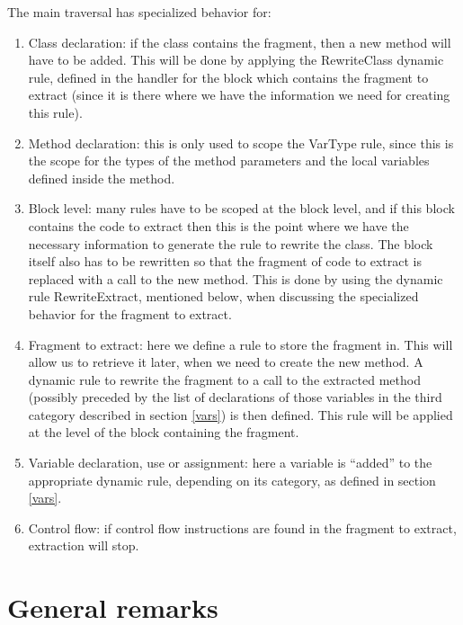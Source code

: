 \documentclass[a4paper,10pt]{article}
\begin{document}
The main traversal has specialized behavior for:

\begin{enumerate}

\item Class declaration: if the class contains the fragment, then
a new method will have to be added. This will be done by applying
the \textsf{RewriteClass} dynamic rule, defined in the handler
for the block which contains the fragment to extract (since it is
there where we have the information we need for creating this
rule).

\item Method declaration: this is only used to scope the \textsf{VarType}
rule, since this is the scope for the types of the method parameters and
the local variables defined inside the method.

\item Block level: many rules have to be scoped at the block level,
and if this block contains the code to extract then this is the
point where we have the necessary information to generate the rule
to rewrite the class. The block itself also has to be rewritten so that
the fragment of code to extract is replaced with a call to the new method.
This is done by using the dynamic rule \textsf{RewriteExtract},
mentioned below, when discussing the specialized behavior for
the fragment to extract.

\item Fragment to extract: here we define a rule to store the
fragment in. This will allow us to retrieve it later, when we need
to create the new method. A dynamic rule to rewrite the fragment
to a call to the extracted method (possibly preceded by the list of
declarations of those variables in the third category described in
section \ref{vars}) is then defined. This rule will be applied at
the level of the block containing the fragment.

\item Variable declaration, use or assignment: here a variable is
``added'' to the appropriate dynamic rule, depending on its category,
as defined in section \ref{vars}.

\item Control flow: if control flow instructions are found in the
fragment to extract, extraction will stop.

\end{enumerate}

\section{General remarks}
\end{document}
